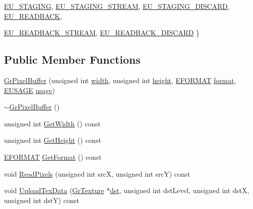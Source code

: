 \begin{CompactItemize}
\hyperlink{class_gr_pixel_buffer_161569e2857876088c519a6e52fd678513cff0ea16eb8a8f48b0548115604cf2}{EU\_\-STAGING}, 
\hyperlink{class_gr_pixel_buffer_161569e2857876088c519a6e52fd6785ed072100eba8d2f26f25c1fbf264a5b8}{EU\_\-STAGING\_\-STREAM}, 
\hyperlink{class_gr_pixel_buffer_161569e2857876088c519a6e52fd678508e14744e7dd821845b327758ff73c43}{EU\_\-STAGING\_\-DISCARD}, 
\hyperlink{class_gr_pixel_buffer_161569e2857876088c519a6e52fd6785ffa83145aa837cae15facc2b201e51cb}{EU\_\-READBACK}, 
\par
\hyperlink{class_gr_pixel_buffer_161569e2857876088c519a6e52fd678561c6835a23f535c41b50a552f79a689a}{EU\_\-READBACK\_\-STREAM}, 
\hyperlink{class_gr_pixel_buffer_161569e2857876088c519a6e52fd678599a17b588d31152a13e7040a957020b4}{EU\_\-READBACK\_\-DISCARD}
 \}
\subsection*{Public Member Functions}
\begin{CompactItemize}
\item 
\hyperlink{class_gr_pixel_buffer_0aa229949b83ad90d393ad926714dd0c}{GrPixelBuffer} (unsigned int \hyperlink{wglext_8h_e6531b1788ca42a9ae8155b0c52e7630}{width}, unsigned int \hyperlink{wglext_8h_b2e63df950c3789599e1e43f477bc9e3}{height}, \hyperlink{class_gr_pixel_buffer_f9df985b34eb04e3465c776a8e9d7cbe}{EFORMAT} \hyperlink{glext__bak_8h_e2d3db041c6004a67047659b42f73a44}{format}, \hyperlink{class_gr_pixel_buffer_161569e2857876088c519a6e52fd6785}{EUSAGE} \hyperlink{glext__bak_8h_ae276f20e85f16470de5a0a71eb25bc2}{usage})
\item 
\hyperlink{class_gr_pixel_buffer_f4613b158302dcab3f6470e886a7339d}{$\sim$GrPixelBuffer} ()
\item 
unsigned int \hyperlink{class_gr_pixel_buffer_5127f030a3b0afa23b3904684d17149d}{GetWidth} () const 
\item 
unsigned int \hyperlink{class_gr_pixel_buffer_da17c29389e6c5b49902dd22db3b3a1a}{GetHeight} () const 
\item 
\hyperlink{class_gr_pixel_buffer_f9df985b34eb04e3465c776a8e9d7cbe}{EFORMAT} \hyperlink{class_gr_pixel_buffer_6a144efcc774c07dbcbccc33da72e6b5}{GetFormat} () const 
\item 
void \hyperlink{class_gr_pixel_buffer_a7010451d7c02dd31cf2ff13eaa4549e}{ReadPixels} (unsigned int srcX, unsigned int srcY) const 
\item 
void \hyperlink{class_gr_pixel_buffer_a43ce43ee74da1547c74dd8bb15f6e92}{UploadTexData} (\hyperlink{class_gr_texture}{GrTexture} $\ast$\hyperlink{glext__bak_8h_92034251bfd455d524a9b5610cddba00}{dst}, unsigned int dstLevel, unsigned int dstX, unsigned int dstY) const 

\end{CompactItemize}
\end{CompactItemize}
